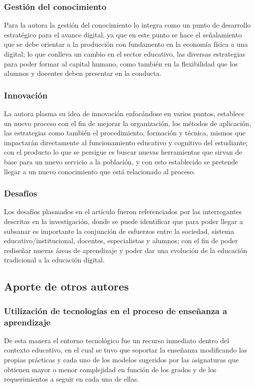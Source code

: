 \documentclass{article}
\begin{document}
\subsubsection{Gestión del conocimiento}
Para la autora la gestión del conocimiento lo integra como un punto de desarrollo estratégico para el avance digital, ya que en este punto se hace el señalamiento que se debe orientar a la producción con fundamento en la economía física a una digital; lo que conlleva un cambio en el sector educativo, las diversas estrategias para poder formar al capital humano, como también en la flexibilidad que los alumnos y docentes deben presentar en la conducta. 

\subsubsection{Innovación}
La autora plasma su idea de innovación enfocándose en varios puntos, establece un nuevo proceso con el fin de mejorar la organización, los métodos de aplicación, las estrategias como también el procedimiento, formación y técnica, mismos que impactarán directamente al funcionamiento educativo y cognitivo del estudiante; con el producto lo que se persigue es buscar nuevas herramientas que sirvan de base para un nuevo servicio a la población, y con esto establecido se pretende llegar a un nuevo conocimiento que está relacionado al proceso.

\subsubsection{Desafíos}
Los desafíos plasmados en el artículo fueron referenciados por las interrogantes descritas en la investigación, donde se puede identificar que para poder llegar a subsanar es importante la conjunción de esfuerzos entre la sociedad, sistema educativo/institucional, docentes, especialistas y alumnos; con el fin de poder rediseñar nuevas áreas de aprendizaje y poder dar una evolución de la educación tradicional a la educación digital.

\subsection{Aporte de otros autores}
\subsubsection{Utilización de tecnologías en el proceso de enseñanza a aprendizaje}
De esta manera el entorno tecnológico fue un recurso inmediato dentro del contexto educativo, en el cual se tuvo que soportar la enseñanza modificando las propias prácticas \citep{Barriaga} y cada uno de los modelos sugeridos por las asignaturas que obtienen mayor o menor complejidad en función de los grados y de los requerimientos a seguir en cada una de ellas.
\end{document}

